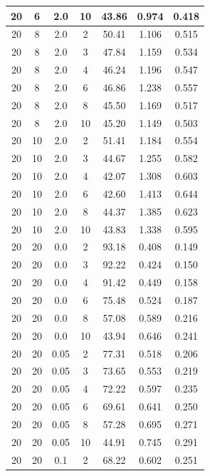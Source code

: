 \documentclass[11pt,a4paper]{article}
\begin{document}
\begin{longtable}{ccccccc}
        20 &  6  &  2.0  & 10 & 43.86 & 0.974 & 0.418 \\
        \midrule
        20 &  8  &  2.0  & 2 & 50.41 & 1.106 & 0.515 \\
        20 &  8  &  2.0  & 3 & 47.84 & 1.159 & 0.534 \\
        20 &  8  &  2.0  & 4 & 46.24 & 1.196 & 0.547 \\
        20 &  8  &  2.0  & 6 & 46.86 & 1.238 & 0.557 \\
        20 &  8  &  2.0  & 8 & 45.50 & 1.169 & 0.517 \\
        20 &  8  &  2.0  & 10 & 45.20 & 1.149 & 0.503 \\
        \midrule
        20 &  10  &  2.0  & 2 & 51.41 & 1.184 & 0.554 \\
        20 &  10  &  2.0  & 3 & 44.67 & 1.255 & 0.582 \\
        20 &  10  &  2.0  & 4 & 42.07 & 1.308 & 0.603 \\
        20 &  10  &  2.0  & 6 & 42.60 & 1.413 & 0.644 \\
        20 &  10  &  2.0  & 8 & 44.37 & 1.385 & 0.623 \\
        20 &  10  &  2.0  & 10 & 43.83 & 1.338 & 0.595 \\
        \midrule
        20 &  20  &  0.0  & 2 & 93.18 & 0.408 & 0.149 \\
        20 &  20  &  0.0  & 3 & 92.22 & 0.424 & 0.150 \\
        20 &  20  &  0.0  & 4 & 91.42 & 0.449 & 0.158 \\
        20 &  20  &  0.0  & 6 & 75.48 & 0.524 & 0.187 \\
        20 &  20  &  0.0  & 8 & 57.08 & 0.589 & 0.216 \\
        20 &  20  &  0.0  & 10 & 43.94 & 0.646 & 0.241 \\
        \midrule
        20 &  20  &  0.05  & 2 & 77.31 & 0.518 & 0.206 \\
        20 &  20  &  0.05  & 3 & 73.65 & 0.553 & 0.219 \\
        20 &  20  &  0.05  & 4 & 72.22 & 0.597 & 0.235 \\
        20 &  20  &  0.05  & 6 & 69.61 & 0.641 & 0.250 \\
        20 &  20  &  0.05  & 8 & 57.28 & 0.695 & 0.271 \\
        20 &  20  &  0.05  & 10 & 44.91 & 0.745 & 0.291 \\
        \midrule
        20 &  20  &  0.1  & 2 & 68.22 & 0.602 & 0.251 \\

\end{longtable}
\end{document}
